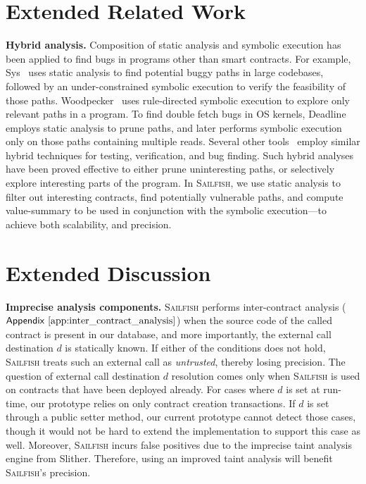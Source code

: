\documentclass[conference, romanappendices]{tex/IEEEtran}
\theoremstyle{bfnote}
\newcommand{\toolname}{\textsc{Sailfish}\xspace}
\newcommand{\slither}{{\sc Slither}\xspace}
\newcommand{\sys}{{\sc Sys}\xspace}
\newcommand{\woodpecker}{{\sc Woodpecker}\xspace}
\newcommand{\deadline}{{\sc Deadline}\xspace}
\newcommand{\smart}{smart contract}
\newcommand{\Appen}[1]{\ensuremath{\sf Appendix~\ref{#1}}}
\begin{document}
\section{Extended Related Work}
\label{app:extended_related_work}
\noindent
\textbf{Hybrid analysis.}
Composition of static analysis and symbolic execution has been applied to find bugs in programs other than \smart s.
For example, \sys~\cite{Fraser20} uses static analysis to find potential {buggy\EndAccSupp{}} paths in large codebases, followed by an under-constrained symbolic execution to verify the feasibility of those paths.
\woodpecker~\cite{Heming13} uses rule-directed symbolic execution to explore only relevant paths in a program.
To find double fetch bugs in OS kernels, \deadline~\cite{Meng18} employs static analysis to prune paths, and later performs symbolic execution only on those paths containing multiple reads.
Several other tools~\cite{Domagoj11,Josselin16, Gerasimov18,Shengjian15,Shengjian16} employ similar hybrid techniques for testing, verification, and bug finding.
Such hybrid analyses have been proved effective to either prune uninteresting paths, or selectively explore interesting parts of the program.
In \toolname, we use static analysis to filter out interesting contracts, find potentially vulnerable paths, and compute value-summary to be used in conjunction with the symbolic execution---to achieve both scalability, and precision.


\section{Extended Discussion}
\label{app:discussion}

\noindent
\textbf{Imprecise analysis components.}
\toolname{} performs inter-contract analysis (\Appen{app:inter_contract_analysis}) when the source code of the called contract is present in our database, and more importantly, the external call destination $d$ is statically known.
If either of the conditions does not hold, \toolname treats such an external call as \textit{untrusted}, thereby losing precision.
The question of external call destination $d$ resolution comes only when \toolname is used on contracts that have been deployed already.
For cases where $d$ is set at run-time, our prototype relies on only contract creation transactions.
If $d$ is set through a public setter method, our current prototype cannot detect those cases, though it would not be hard to extend the implementation to support this case as well.
Moreover, \toolname incurs false positives due to the imprecise taint analysis engine from \slither.
Therefore, using an improved taint analysis will benefit \toolname's precision.
\end{document}
